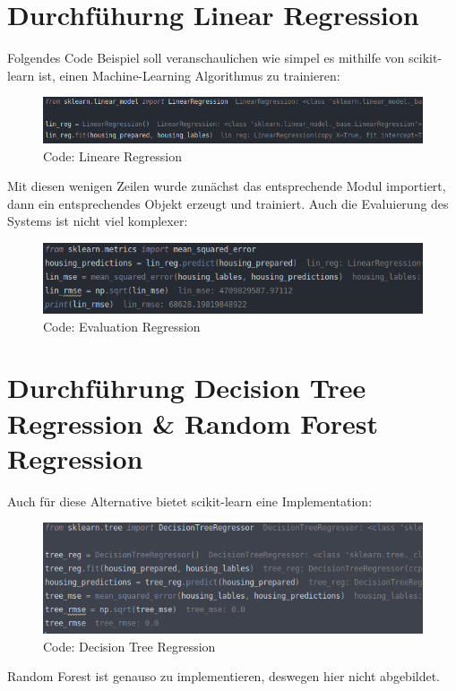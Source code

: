 \section{Durchfühurng Linear Regression}
\label{durchfühurngLinearRegression}
Folgendes Code Beispiel soll veranschaulichen wie simpel es mithilfe von scikit-learn ist, einen Machine-Learning Algorithmus zu trainieren:
\begin{figure}
	\includegraphics[width=1.0\textwidth]{../Bilder/pasted image 0 (1).png}
	\caption{Code: Lineare Regression}
\end{figure}
Mit diesen wenigen Zeilen wurde zunächst das entsprechende Modul importiert, dann ein entsprechendes Objekt erzeugt und trainiert. 
Auch die Evaluierung des Systems ist nicht viel komplexer:
\newline
\begin{figure}
	\includegraphics[width=1.0\textwidth]{../Bilder/pasted image 0 (2).png}
	\caption{Code: Evaluation Regression}
\end{figure}

\section{Durchführung Decision Tree Regression \& Random Forest Regression}
\label{durchführungDecisionTreeRegressionRandomForestRegression}
Auch für diese Alternative bietet scikit-learn eine Implementation:
\newline
\begin{figure}
	\includegraphics[width=1.0\textwidth]{../Bilder/pasted image 0 (3).png}
	\caption{Code: Decision Tree Regression}
\end{figure}
Random Forest ist genauso zu implementieren, deswegen hier nicht abgebildet.

